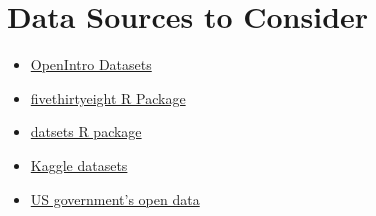 \documentclass[12pt]{article}
\begin{document}
\section*{Data Sources to Consider }
\begin{itemize}
    \item \href{https://www.openintro.org/data/}{OpenIntro Datasets}
    \item \href{https://cran.r-project.org/web/packages/fivethirtyeight/vignettes/fivethirtyeight.html}{fivethirtyeight 
    R Package}
    \item \href{https://stat.ethz.ch/R-manual/R-devel/library/datasets/html/00Index.html}{datsets R package}
    \item \href{https://www.kaggle.com/datasets}{Kaggle datasets}
    \item \href{https://data.gov/}{US government's open data}
\end{itemize}
\end{document}
